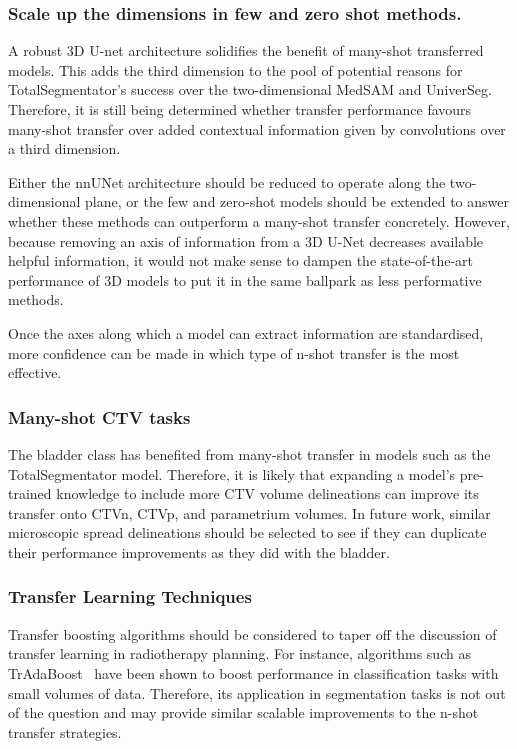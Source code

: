 \documentclass[11pt,twoside]{report}
\begin{document}
\subsubsection{Scale up the dimensions in few and zero shot methods.}

A robust 3D U-net architecture solidifies the benefit of many-shot transferred models. This adds the third dimension to the pool of potential reasons for TotalSegmentator's success over the two-dimensional MedSAM and UniverSeg. Therefore, it is still being determined whether transfer performance favours many-shot transfer over added contextual information given by convolutions over a third dimension.

Either the nnUNet architecture should be reduced to operate along the two-dimensional plane, or the few and zero-shot models should be extended to answer whether these methods can outperform a many-shot transfer concretely. However, because removing an axis of information from a 3D U-Net decreases available helpful information, it would not make sense to dampen the state-of-the-art performance of 3D models to put it in the same ballpark as less performative methods.

Once the axes along which a model can extract information are standardised, more confidence can be made in which type of n-shot transfer is the most effective.

\subsubsection{Many-shot CTV tasks}

The bladder class has benefited from many-shot transfer in models such as the TotalSegmentator model. Therefore, it is likely that expanding a model's pre-trained knowledge to include more CTV volume delineations can improve its transfer onto CTVn, CTVp, and parametrium volumes. In future work, similar microscopic spread delineations should be selected to see if they can duplicate their performance improvements as they did with the bladder.

\subsubsection{Transfer Learning Techniques}

Transfer boosting algorithms should be considered to taper off the discussion of transfer learning in radiotherapy planning. For instance, algorithms such as TrAdaBoost~\cite{transfer-learning-boosting} have been shown to boost performance in classification tasks with small volumes of data. Therefore, its application in segmentation tasks is not out of the question and may provide similar scalable improvements to the n-shot transfer strategies.
\end{document}
